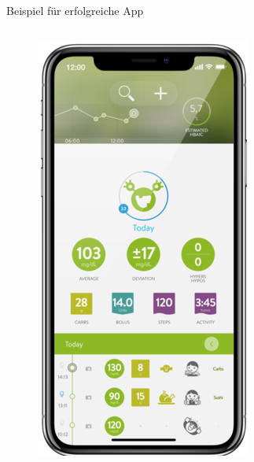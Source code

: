 \begin{frame}{Beispiel für erfolgreiche App}
\begin{columns}
\begin{column}{0.6\textwidth}
\begin{figure}
\begin{minipage}{0.33\textwidth}
                    \includegraphics[width=\textwidth]{Bilder/mysugr2.png}
                \end{minipage}%
                \begin{minipage}{0.33\textwidth}

\end{minipage}
\end{figure}
\end{column}
\end{columns}
\end{frame}
